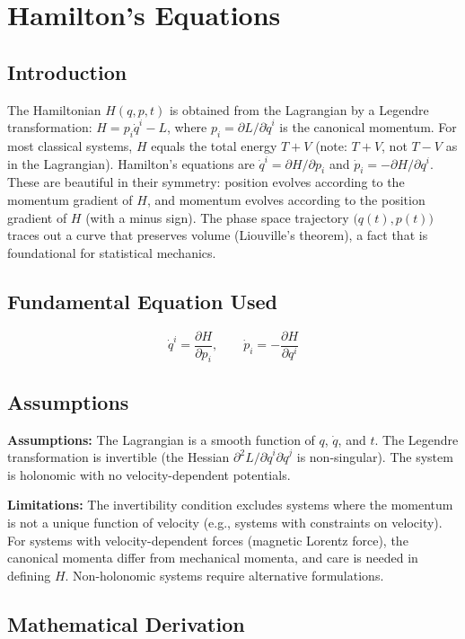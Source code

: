 \chapter{Hamilton's Equations}

\section*{Introduction}

The Hamiltonian $H(q,p,t)$ is obtained from the Lagrangian by a Legendre transformation: $H = p_i\dot{q}^i - L$, where $p_i = \partial L/\partial\dot{q}^i$ is the canonical momentum. For most classical systems, $H$ equals the total energy $T + V$ (note: $T + V$, not $T - V$ as in the Lagrangian). Hamilton's equations are $\dot{q}^i = \partial H/\partial p_i$ and $\dot{p}_i = -\partial H/\partial q^i$. These are beautiful in their symmetry: position evolves according to the momentum gradient of $H$, and momentum evolves according to the position gradient of $H$ (with a minus sign). The phase space trajectory $\bigl(q(t), p(t)\bigr)$ traces out a curve that preserves volume (Liouville's theorem), a fact that is foundational for statistical mechanics.
\section*{Fundamental Equation Used}

\[
\dot{q}^i = \frac{\partial H}{\partial p_i},\qquad \dot{p}_i = -\frac{\partial H}{\partial q^i}
\]
\section*{Assumptions}

\textbf{Assumptions:} The Lagrangian is a smooth function of $q$, $\dot{q}$, and $t$. The Legendre transformation is invertible (the Hessian $\partial^2 L/\partial\dot{q}^i\partial\dot{q}^j$ is non-singular). The system is holonomic with no velocity-dependent potentials.


\textbf{Limitations:} The invertibility condition excludes systems where the momentum is not a unique function of velocity (e.g., systems with constraints on velocity). For systems with velocity-dependent forces (magnetic Lorentz force), the canonical momenta differ from mechanical momenta, and care is needed in defining $H$. Non-holonomic systems require alternative formulations.


\section*{Mathematical Derivation}


